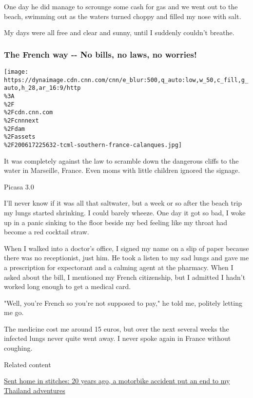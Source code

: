 One day he did manage to scrounge some cash for gas and we went out to
the beach, swimming out as the waters turned choppy and filled my nose
with salt.

My days were all free and clear and sunny, until I suddenly couldn't
breathe.

\hypertarget{the-french-way----no-bills-no-laws-no-worries}{%
\subsubsection{The French way -\/- No bills, no laws, no
worries!}\label{the-french-way----no-bills-no-laws-no-worries}}

\href{/travel/article/trip-changed-my-life-southern-france/index.html?gallery=8}{}

\texttt{[image: https://dynaimage.cdn.cnn.com/cnn/e\_blur:500,q\_auto:low,w\_50,c\_fill,g\_auto,h\_28,ar\_16:9/http\\\%3A\\\%2F\\\%2Fcdn.cnn.com\\\%2Fcnnnext\\\%2Fdam\\\%2Fassets\\\%2F200617225632-tcml-southern-france-calanques.jpg]}

It was completely against the law to scramble down the dangerous cliffs
to the water in Marseille, France. Even moms with little children
ignored the signage.

Picasa 3.0

I'll never know if it was all that saltwater, but a week or so after the
beach trip my lungs started shrinking. I could barely wheeze. One day it
got so bad, I woke up in a panic sinking to the floor beside my bed
feeling like my throat had become a red cocktail straw.

When I walked into a doctor's office, I signed my name on a slip of
paper because there was no receptionist, just him. He took a listen to
my sad lungs and gave me a prescription for expectorant and a calming
agent at the pharmacy. When I asked about the bill, I mentioned my
French citizenship, but I admitted I hadn't worked long enough to get a
medical card.

"Well, you're French so you're not supposed to pay," he told me,
politely letting me go.

The medicine cost me around 15 euros, but over the next several weeks
the infected lungs never quite went away. I never spoke again in France
without coughing.

Related content

\href{/travel/article/trip-that-changed-my-life-thailand-motorbike-accident/index.html}{Sent
home in stitches: 20 years ago, a motorbike accident put an end to my
Thailand adventures}

